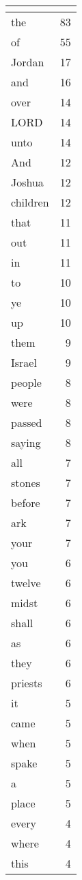 \begin{center}
\begin{longtable}{l|r}
\hline \multicolumn{2}{c}{{ }} \\ \hline
\endfoot 
the & 83\\ \hline 
of & 55\\ \hline 
Jordan & 17\\ \hline 
and & 16\\ \hline 
over & 14\\ \hline 
LORD & 14\\ \hline 
unto & 14\\ \hline 
And & 12\\ \hline 
Joshua & 12\\ \hline 
children & 12\\ \hline 
that & 11\\ \hline 
out & 11\\ \hline 
in & 11\\ \hline 
to & 10\\ \hline 
ye & 10\\ \hline 
up & 10\\ \hline 
them & 9\\ \hline 
Israel & 9\\ \hline 
people & 8\\ \hline 
were & 8\\ \hline 
passed & 8\\ \hline 
saying & 8\\ \hline 
all & 7\\ \hline 
stones & 7\\ \hline 
before & 7\\ \hline 
ark & 7\\ \hline 
your & 7\\ \hline 
you & 6\\ \hline 
twelve & 6\\ \hline 
midst & 6\\ \hline 
shall & 6\\ \hline 
as & 6\\ \hline 
they & 6\\ \hline 
priests & 6\\ \hline 
it & 5\\ \hline 
came & 5\\ \hline 
when & 5\\ \hline 
spake & 5\\ \hline 
a & 5\\ \hline 
place & 5\\ \hline 
every & 4\\ \hline 
where & 4\\ \hline 
this & 4\\ \hline 

\end{longtable}
\end{center}
